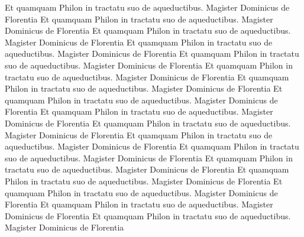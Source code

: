 \documentclass{book}
\begin{document}
\begin{pairs}
\begin{Leftside}
\beginnumbering
\pstart
Et quamquam Philon in tractatu suo de aqueductibus. Magister Dominicus de Florentia
Et quamquam Philon in tractatu suo de aqueductibus. Magister Dominicus de Florentia
Et quamquam Philon in tractatu suo de aqueductibus. Magister Dominicus de Florentia
Et quamquam Philon in tractatu suo de aqueductibus. Magister Dominicus de Florentia
Et quamquam Philon in tractatu suo de aqueductibus. Magister Dominicus de Florentia
Et quamquam Philon in tractatu suo de aqueductibus. Magister Dominicus de Florentia
Et quamquam Philon in tractatu suo de aqueductibus. Magister Dominicus de Florentia
Et quamquam Philon in tractatu suo de aqueductibus. Magister Dominicus de Florentia
Et quamquam Philon in tractatu suo de aqueductibus. Magister Dominicus de Florentia
Et quamquam Philon in tractatu suo de aqueductibus. Magister Dominicus de Florentia
Et quamquam Philon in tractatu suo de aqueductibus. Magister Dominicus de Florentia
Et quamquam Philon in tractatu suo de aqueductibus. Magister Dominicus de Florentia
Et quamquam Philon in tractatu suo de aqueductibus. Magister Dominicus de Florentia
Et quamquam Philon in tractatu suo de aqueductibus. Magister Dominicus de Florentia
Et quamquam Philon in tractatu suo de aqueductibus. Magister Dominicus de Florentia
Et quamquam Philon in tractatu suo de aqueductibus. Magister Dominicus de Florentia
Et quamquam Philon in tractatu suo de aqueductibus. Magister Dominicus de Florentia

\end{Leftside}
\end{pairs}
\end{document}
